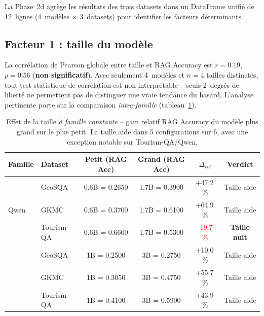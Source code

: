 \documentclass[12pt,a4paper]{article}
\begin{document}
La Phase~2d agr\`ege les r\'esultats des trois datasets dans un DataFrame unifi\'e de
12~lignes (4~mod\`eles $\times$ 3~datasets) pour identifier les facteurs d\'eterminants.

\subsection{Facteur 1 : taille du mod\`ele}
\label{sec:effet_taille}

La corr\'elation de Pearson globale entre taille et RAG Accuracy est $r = 0.19$,
$p = 0.56$ (\textbf{non significatif}). Avec seulement 4~mod\`eles et $n = 4$ tailles
distinctes, tout test statistique de corr\'elation est non interpr\'etable -- seuls
2~degr\'es de libert\'e ne permettent pas de distinguer une vraie tendance du hasard.
L'analyse pertinente porte sur la comparaison \textit{intra-famille}
(tableau~\ref{tab:intra_famille}).

\begin{table}[H]
\centering
\caption{Effet de la taille \textit{\`a famille constante} -- gain relatif RAG Accuracy
  du mod\`ele plus grand sur le plus petit. La taille aide dans 5 configurations sur 6,
  avec une exception notable sur Tourism-QA/Qwen.}
\label{tab:intra_famille}
\begin{tabular}{@{} l l c c c c @{}}
\toprule
\textbf{Famille} & \textbf{Dataset}
  & \textbf{Petit (RAG Acc)} & \textbf{Grand (RAG Acc)}
  & \textbf{$\Delta_{rel}$} & \textbf{Verdict} \\
\midrule
\multirow{3}{*}{Qwen}
  & GeoSQA     & 0.6B = 0.2650 & 1.7B = 0.3900
    & \textcolor{green!60!black}{+47.2\,\%} & Taille aide \\
  & GKMC       & 0.6B = 0.3700 & 1.7B = 0.6100
    & \textcolor{green!60!black}{+64.9\,\%} & Taille aide \\
  & Tourism-QA & 0.6B = 0.6600 & 1.7B = 0.5300
    & \textcolor{red}{--19.7\,\%} & \textbf{Taille nuit} \\
\midrule
\rowcolor{lightgray}
\multirow{3}{*}{Llama}
  & GeoSQA     & 1B = 0.2500 & 3B = 0.2750
    & \textcolor{green!60!black}{+10.0\,\%} & Taille aide \\
\rowcolor{lightgray}
  & GKMC       & 1B = 0.3050 & 3B = 0.4750
    & \textcolor{green!60!black}{+55.7\,\%} & Taille aide \\
\rowcolor{lightgray}
  & Tourism-QA & 1B = 0.4100 & 3B = 0.5900
    & \textcolor{green!60!black}{+43.9\,\%} & Taille aide \\
\bottomrule
\end{tabular}
\end{table}
\end{document}
